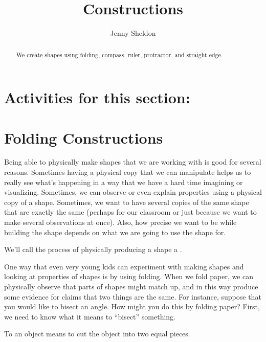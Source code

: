 \documentclass{ximera}
\title{Constructions}
\author{Jenny Sheldon}
\begin{document}
\begin{abstract}
We create shapes using folding, compass, ruler, protractor, and straight edge.
\end{abstract}
\maketitle

\section{Activities for this section:} 



\section{Folding Constructions}
Being able to physically make shapes that we are working with is good for several reasons. Sometimes having a physical copy that we can manipulate helps us to really see what's happening in a way that we have a hard time imagining or visualizing. Sometimes, we can observe or even explain properties using a physical copy of a shape. Sometimes, we want to have several copies of the same shape that are exactly the same (perhaps for our classroom or just because we want to make several observations at once). Also, how precise we want to be while building the shape depends on what we are going to use the shape for.

We'll call the process of physically producing a shape a .

One way that even very young kids can experiment with making shapes and looking at properties of shapes is by using folding. When we fold paper, we can physically observe that parts of shapes might match up, and in this way produce some evidence for claims that two things are the same. For instance, suppose that you would like to bisect an angle. How might you do this by folding paper? First, we need to know what it means to ``bisect'' something.

\begin{definition}
To  an object means to cut the object into two equal pieces.
\end{definition}
\end{document}
